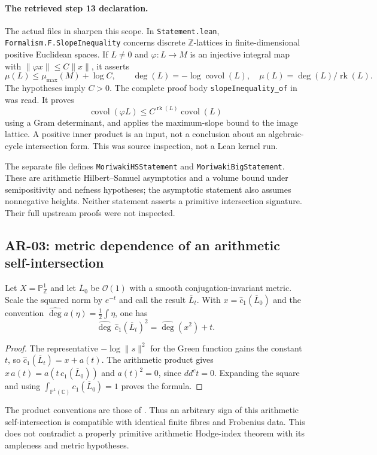 \paragraph{The retrieved step 13 declaration.}
The actual files in  sharpen this scope.
In \texttt{Statement.lean}, \texttt{Formalism.F.SlopeInequality} concerns
discrete $\mathbb Z$-lattices in finite-dimensional positive Euclidean
spaces.  If $L\ne0$ and $\varphi:L\to M$ is an injective integral map
with $\|\varphi x\|\le C\|x\|$, it asserts
\[
 \mu(L)\le\mu_{\max}(M)+\log C,\qquad
 \deg(L)=-\log\operatorname{covol}(L),\quad
 \mu(L)=\deg(L)/\operatorname{rk}(L).
\]
The hypotheses imply $C>0$.  The complete proof body
\texttt{slopeInequality\_of} in
 was read.  It proves
\[
 \operatorname{covol}(\varphi L)
 \le C^{\operatorname{rk}(L)}\operatorname{covol}(L)
\]
using a Gram determinant, and applies the maximum-slope bound to the image
lattice.  A positive inner product is an input, not a conclusion about an
algebraic-cycle intersection form.  This was source inspection, not a Lean
kernel run.

The separate file
 defines
\texttt{MoriwakiHSStatement} and \texttt{MoriwakiBigStatement}.  These
are arithmetic Hilbert--Samuel asymptotics and a volume bound under
semipositivity and nefness hypotheses; the asymptotic statement also assumes
nonnegative heights.  Neither statement asserts a primitive intersection
signature.  Their full upstream proofs were not inspected.

\subsection{AR-03: metric dependence of an arithmetic self-intersection}
\label{ar:metric}

Let $X=\mathbb P^1_{\mathbb Z}$ and let $\overline L_0$ be
$\mathcal O(1)$ with a smooth conjugation-invariant metric.  Scale the
squared norm by $e^{-t}$ and call the result $\overline L_t$.  With
$x=\widehat c_1(\overline L_0)$ and the convention
$\widehat{\deg}a(\eta)=\frac12\int\eta$, one has
\[
 \widehat{\deg}\,\widehat c_1(\overline L_t)^2
       =\widehat{\deg}(x^2)+t.
\]
\begin{proof}
The representative $-\log\|s\|^2$ for the Green function gains the
constant $t$, so $\widehat c_1(\overline L_t)=x+a(t)$.  The arithmetic
product gives $x\,a(t)=a(t\,c_1(\overline L_0))$ and $a(t)^2=0$,
since $dd^ct=0$.  Expanding the square and using
$\int_{\mathbb P^1(\mathbb C)}c_1(\overline L_0)=1$ proves the formula.
\end{proof}
The product conventions are those of
\cite[\S4.2.11 and \S4.3, especially Theorem 4.3.2]{GilletSoule}.
Thus an arbitrary sign of this arithmetic self-intersection is compatible
with identical finite fibres and Frobenius data.  This does not contradict
a properly primitive arithmetic Hodge-index theorem with its ampleness and
metric hypotheses.

